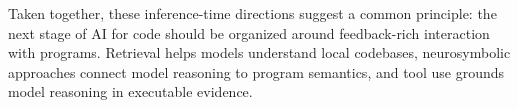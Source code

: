 Taken together, these inference-time directions suggest a common principle: the next stage of AI for code should be organized around feedback-rich interaction with programs. Retrieval helps models understand local codebases, neurosymbolic approaches connect model reasoning to program semantics, and tool use grounds model reasoning in executable evidence.
